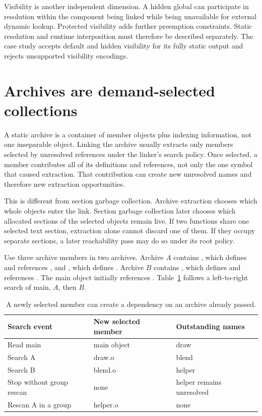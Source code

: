 Visibility is another independent dimension.
A hidden global can participate in resolution within the component being linked while being unavailable for external dynamic lookup.
Protected visibility adds further preemption constraints.
Static resolution and runtime interposition must therefore be described separately.
The case study accepts default and hidden visibility for its fully static output and rejects unsupported visibility encodings.

\section{Archives are demand-selected collections}
\label{sec:ch57-archives}

A static archive is a container of member objects plus indexing information, not one inseparable object.
Linking the archive usually extracts only members selected by unresolved references under the linker's search policy.
Once selected, a member contributes all of its definitions and references, not only the one symbol that caused extraction.
That contribution can create new unresolved names and therefore new extraction opportunities.

This is different from section garbage collection.
Archive extraction chooses which whole objects enter the link.
Section garbage collection later chooses which allocated sections of the selected objects remain live.
If two functions share one selected text section, extraction alone cannot discard one of them.
If they occupy separate sections, a later reachability pass may do so under its root policy.

Use three archive members in two archives.
Archive $A$ contains , which defines  and references , and , which defines .
Archive $B$ contains , which defines  and references .
The main object initially references .
Table~\ref{tab:ch57-archive} follows a left-to-right search of main, $A$, then $B$.

\begin{table}[htbp]
\caption{A newly selected member can create a dependency on an archive already passed.}
\label{tab:ch57-archive}
\centering
\begin{tabular}{lll}
\toprule
Search event & New selected member & Outstanding names \\
\midrule
Read main & main object & draw \\
Search A & draw.o & blend \\
Search B & blend.o & helper \\
Stop without group rescan & none & helper remains unresolved \\
Rescan A in a group & helper.o & none \\
\bottomrule
\end{tabular}
\end{table}

